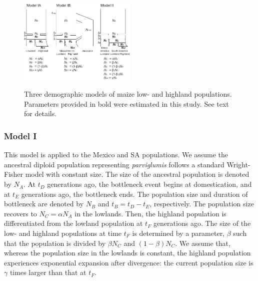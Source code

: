 \begin{figure}[tb]   
  \begin{center}
   \vspace{-0mm}
   \includegraphics[width=0.5\textwidth]{fig/Fig3}
   \renewcommand{\baselinestretch}{0.9}
   \vspace{-3mm}
   \caption{Three demographic models of maize low- and highland populations.  Parameters provided in bold were estimated in this study.  See text for details.
   }
\vspace{-6mm}
    \label{model}
  \end{center}
\end{figure}

\subsubsection{Model I}
This model is applied to the Mexico and SA populations.
We assume the ancestral diploid population representing \emph{parviglumis} follows a standard Wright-Fisher model with constant size.  The size of the ancestral population is denoted by $N_A$.
At $t_D$ generations ago, the bottleneck event begins at domestication, and at $t_E$ generations ago, the bottleneck ends.  The population size and duration of bottleneck are denoted by $N_B$ and $t_B=t_D-t_E$, respectively.  The population size recovers to $N_C=\alpha N_A$ in the lowlands.  
Then, the highland population is differentiated from the lowland population at $t_F$ generations ago.  The size of the low- and highland populations at time $t_F$ is determined by a parameter, $\beta$ such that the population is divided by $\beta N_C$ and $(1-\beta)N_C$.  
We assume that, whereas the population size in the lowlands is constant, the highland population experiences exponential expansion after divergence: the current population size is $\gamma$ times larger than that at $t_F$.  \\

